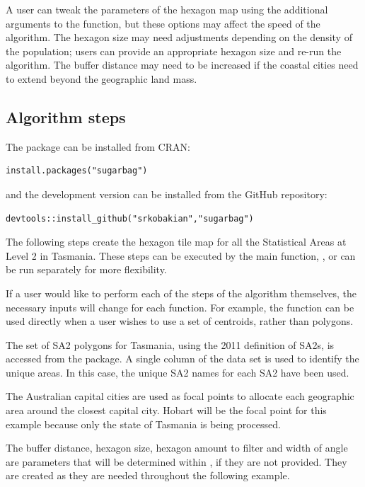 A user can tweak the parameters of the hexagon map using the additional arguments to the  function, but these options may affect the speed of the algorithm.
The hexagon size may need adjustments depending on the density of the population; users can provide an appropriate hexagon size and re-run the algorithm. The buffer distance may need to be increased if the coastal cities need to extend beyond the geographic land mass.

\hypertarget{algorithm-steps}{%
\subsection{Algorithm steps}\label{algorithm-steps}}

The package can be installed from CRAN:

\begin{verbatim}
install.packages("sugarbag")
\end{verbatim}

\noindent and the development version can be installed from the GitHub repository:

\begin{verbatim}
devtools::install_github("srkobakian","sugarbag")
\end{verbatim}

The following steps create the hexagon tile map for all the Statistical Areas at Level 2 in Tasmania. These steps can be executed by the main function, , or can be run separately for more flexibility.

If a user would like to perform each of the steps of the algorithm themselves, the necessary inputs will change for each function. For example, the  function can be used directly when a user wishes to use a set of centroids, rather than polygons.

The set of SA2 polygons for Tasmania, using the 2011 definition of SA2s, is accessed from the  package. A single column of the data set is used to identify the unique areas. In this case, the unique SA2 names for each SA2 have been used.

The Australian capital cities are used as focal points to allocate each geographic area around the closest capital city. Hobart will be the focal point for this example because only the state of Tasmania is being processed.

The buffer distance, hexagon size, hexagon amount to filter and width of angle are parameters that will be determined within , if they are not provided. They are created as they are needed throughout the following example.

